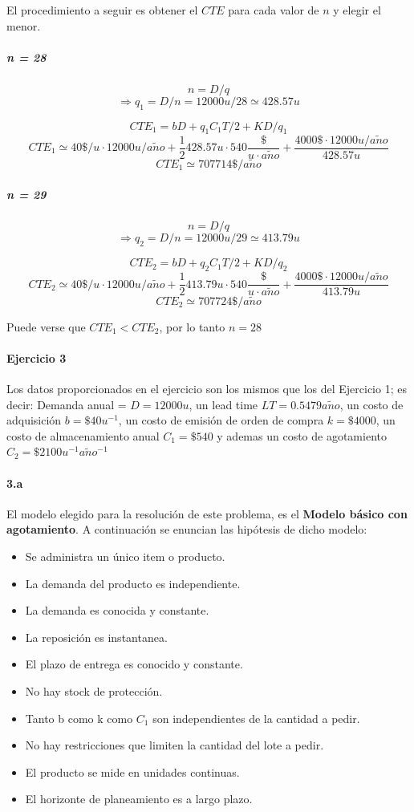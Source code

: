 \documentclass{article}
\def \anio {a\tilde{n}o}
\begin{document}
	El procedimiento a seguir es obtener el $CTE$ para cada valor de $n$ y elegir el menor.

	\subparagraph{n = 28}
	$$ n = D / q $$
	$$\Rightarrow q_1 = D / n = 12000u/28 \simeq 428.57u $$

        $$ CTE_1 = b D + q_1 C_1 T / 2 + K D / q_1 $$
        $$ CTE_1 \simeq 40\$/u \cdot 12000u/\anio + \frac{1}{2} 428.57u \cdot 540\frac{\$}{u\cdot\anio} + \frac{4000\$ \cdot 12000u/\anio}{428.57u} $$
        $$ CTE_1 \simeq 707714 \$/\anio $$

	\subparagraph{n = 29}
	$$ n = D / q $$
	$$\Rightarrow q_2 = D / n = 12000u/29 \simeq 413.79u $$

        $$ CTE_2 = b D + q_2 C_1 T / 2 + K D / q_2 $$
        $$ CTE_2 \simeq 40\$/u \cdot 12000u/\anio + \frac{1}{2} 413.79u \cdot 540\frac{\$}{u\cdot\anio} + \frac{4000\$ \cdot 12000u/\anio}{413.79u} $$
        $$ CTE_2 \simeq 707724 \$/\anio $$

        Puede verse que $CTE_1 < CTE_2$, por lo tanto $ \boxed{ n = 28 } $


\paragraph{Ejercicio 3}

Los datos proporcionados en el ejercicio son los mismos que los del Ejercicio 1; es decir:
Demanda anual = $ D = 12000 u $, un lead time $ LT = 0.5479 \anio $, un costo de adquisici\'on $ b = \$40 u^{-1} $, un costo de emisi\'on de orden de compra $ k = \$4000 $, 
un costo de almacenamiento anual $ C_1 = \$540 $ y ademas un costo de agotamiento $ C_2 = \$2100 u^{-1}\anio^{-1} $

  \paragraph{3.a}
   El modelo elegido para la resoluci\'on de este problema, es el {\bf Modelo b\'asico con agotamiento}. A continuaci\'on se enuncian las hip\'otesis de dicho modelo:

  \begin{itemize}
   \item Se administra un \'unico item o producto.
   \item La demanda del producto es independiente.
   \item La demanda es conocida y constante.
   \item La reposici\'on es instantanea.
   \item El plazo de entrega es conocido y constante.
   \item No hay stock de protecci\'on.
   \item Tanto b como k como $ C_1 $ son independientes de la cantidad a pedir.
   \item No hay restricciones que limiten la cantidad del lote a pedir.
   \item El producto se mide en unidades continuas.
   \item El horizonte de planeamiento es a largo plazo.
  \end{itemize}
\end{document}
